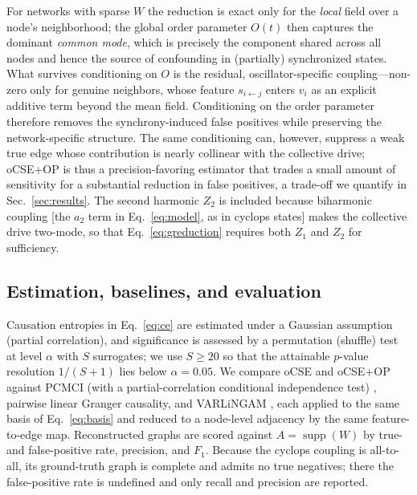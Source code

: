 For networks with sparse $W$ the reduction is exact only for the \emph{local}
field over a node's neighborhood; the global order parameter $O(t)$ then captures
the dominant \emph{common mode}, which is precisely the component shared across
all nodes and hence the source of confounding in (partially) synchronized
states. What survives conditioning on $O$ is the residual, oscillator-specific
coupling---non-zero only for genuine neighbors, whose feature $s_{i\leftarrow j}$
enters $v_i$ as an explicit additive term beyond the mean field. Conditioning on
the order parameter therefore removes the synchrony-induced false positives while
preserving the network-specific structure. The same conditioning can, however,
suppress a weak true edge whose contribution is nearly collinear with the
collective drive; oCSE+OP is thus a precision-favoring estimator that trades a
small amount of sensitivity for a substantial reduction in false positives, a
trade-off we quantify in Sec.~\ref{sec:results}. The second harmonic $Z_2$ is
included because biharmonic coupling [the $a_2$ term in Eq.~\eqref{eq:model}, as
in cyclops states] makes the collective drive two-mode, so that
Eq.~\eqref{eq:greduction} requires both $Z_1$ and $Z_2$ for sufficiency.

\subsection{Estimation, baselines, and evaluation}
\label{sec:estimation}

Causation entropies in Eq.~\eqref{eq:ce} are estimated under a Gaussian
assumption (partial correlation), and significance is assessed by a permutation
(shuffle) test at level $\alpha$ with $S$ surrogates; we use $S\ge20$ so that the
attainable $p$-value resolution $1/(S{+}1)$ lies below $\alpha=0.05$. We compare
oCSE and oCSE+OP against PCMCI (with a partial-correlation conditional
independence test) \cite{Runge2019}, pairwise linear Granger causality, and
VARLiNGAM \cite{Hyvarinen2010}, each applied to the same basis of
Eq.~\eqref{eq:basis} and reduced to a node-level adjacency by the same
feature-to-edge map. Reconstructed graphs are scored against
$A=\operatorname{supp}(W)$ by true- and false-positive rate, precision, and
$F_1$. Because the cyclops coupling is all-to-all, its ground-truth graph is
complete and admits no true negatives; there the false-positive rate is undefined
and only recall and precision are reported.
